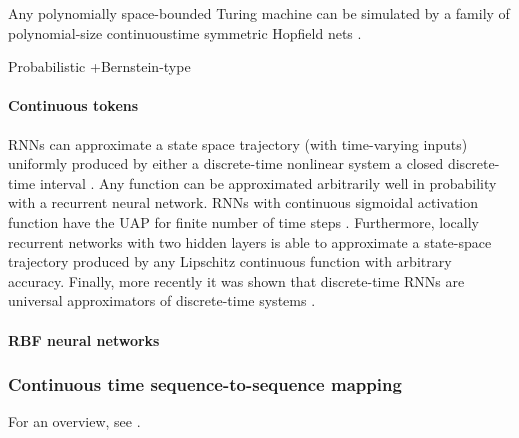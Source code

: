 \documentclass{article}
\theoremstyle{definition}
\theoremstyle{remark}
\newcounter{ct}
\begin{document}
Any polynomially space-bounded Turing machine can be simulated by a family of polynomial-size continuoustime symmetric Hopfield nets \citep{sima2003continuous}.

\citep{cabessa2019turing}
\citep{perez2019turing}
\citep{dehghani2018universal, yun2019transformers}
\citep{chung2021turing}
\citep{perez2021attention}
\citep{giannou2023looped}
\citep{stogin2024provably}


Probabilistic \citep{nowak2023representational, nowak2024representational}
+Bernstein-type \citep{veeravalli2023nonlinear}

\paragraph{Continuous tokens}
RNNs can approximate a state space trajectory (with time-varying inputs) uniformly  produced by either a discrete-time nonlinear system a closed discrete-time interval \citep{jin1995universal}.
%
Any function can be approximated arbitrarily well in probability with a recurrent neural network\citep{hammer2000approximation}.  %
%
RNNs with continuous sigmoidal activation function have the UAP for finite number of time steps \citep{schafer2006recurrent, schafer2007uap}.
%
Furthermore, locally recurrent networks with two hidden layers is able to approximate a state-space trajectory produced by any Lipschitz continuous function with arbitrary accuracy\citep{patan2008approximation}.
%
Finally, more recently it was shown that discrete-time RNNs are universal approximators of discrete-time systems \citep{aguiar2023universal}.

\paragraph{RBF neural networks}
\citep{tan1995efficient}




\subsubsection{Continuous time sequence-to-sequence mapping}
For an overview, see \citep{garces2012strategies}.
\end{document}
